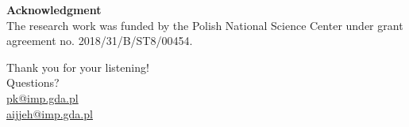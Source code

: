\documentclass[10pt,aspectratio=169]{beamer} %
\begin{document}
{
\begin{frame}[standout]
	\textbf{Acknowledgment} \\ 
	The research work was funded by the Polish National Science Center under grant agreement no. 2018/31/B/ST8/00454.
\end{frame}

\begin{frame}[standout]
  Thank you for your listening!\\ \vspace{12pt}
  Questions?\\ \vspace{12pt}
  \url{pk@imp.gda.pl}\\
  \url{aijjeh@imp.gda.pl}
\end{frame}
}
\end{document}
